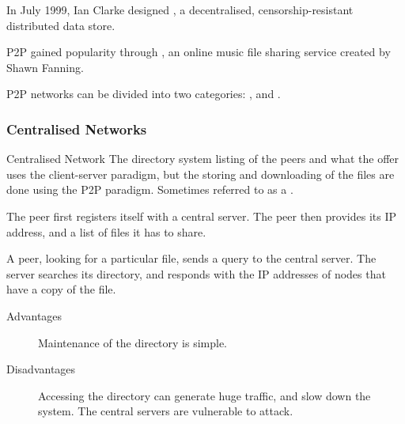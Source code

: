 \documentclass[\main/notes.tex]{subfiles}
\begin{document}
				In July 1999, Ian Clarke designed , a decentralised, censorship-resistant distributed data store.

				P2P gained popularity through , an online music file sharing service created by Shawn Fanning.

				P2P networks can be divided into two categories: , and .
				\subsubsection{Centralised Networks}
					\begin{definition}{Centralised Network}
						The directory system listing of the peers and what the offer uses the client-server paradigm, but the storing and downloading of the files are done using the P2P paradigm. Sometimes referred to as a .

						The peer first registers itself with a central server. The peer then provides its IP address, and a list of files it has to share.

						A peer, looking for a particular file, sends a query to the central server. The server searches its directory, and responds with the IP addresses of nodes that have a copy of the file.

						\begin{indentparagraph}
							\begin{description}
								\item[Advantages] Maintenance of the directory is simple.
								\item[Disadvantages] Accessing the directory can generate huge traffic, and slow down the system. The central servers are vulnerable to attack.
							\end{description}
						\end{indentparagraph}
					\end{definition}
\end{document}
